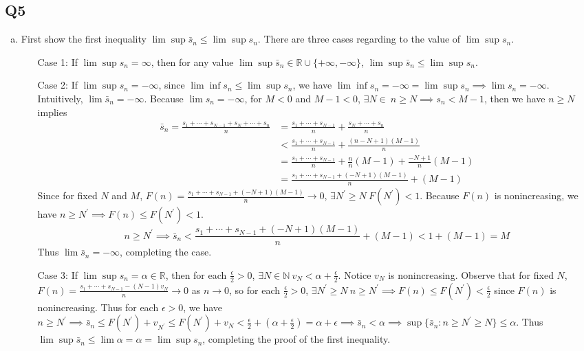 \documentclass[12pt,lettersize]{article}
\newcommand{\R}{\mathbb{R}}
\newcommand{\N}{\mathbb{N}}
\theoremstyle{remark}
\begin{document}
	\subsection*{Q5}
	\begin{enumerate}[(a)]
		\item First show the first inequality $\lim\sup\bar{s}_n\leq\lim\sup s_n$. There are three cases regarding to the value of $\lim\sup s_n$.
		\begin{itemize}
			\item[Case 1:] If $\lim\sup s_n=\infty$, then for any value $\lim\sup\bar{s}_n\in\R\cup\{+\infty,-\infty\}$, $\lim\sup\bar{s}_n\leq\lim\sup s_n$.
			
			\item[Case 2:] If $\lim\sup s_n=-\infty$, since $\lim\inf s_n\leq\lim\sup s_n$, we have $\lim\inf s_n=-\infty=\lim\sup s_n\implies \lim s_n=-\infty$. Intuitively, $\lim\bar{s}_n=-\infty$.  Because $\lim s_n=-\infty$, for $M<0$ and $M-1<0$, $\exists N\in\ n\geq N\implies s_n<M-1$, then we have $n\geq N$ implies
			\begin{align*}
				\bar{s}_n = \frac{s_1+\cdots+s_{N-1}+s_N+\cdots+s_n}{n} &= \frac{s_1+\cdots+s_{N-1}}{n}+\frac{s_N+\cdots+s_n}{n}\\
				&< \frac{s_1+\cdots+s_{N-1}}{n} + \frac{(n-N+1)(M-1)}{n}\\
				&= \frac{s_1+\cdots+s_{N-1}}{n} + \frac{n}{n}(M-1)+\frac{-N+1}{n}(M-1)\\
				&= \frac{s_1+\cdots+s_{N-1}+(-N+1)(M-1)}{n} + (M-1)
			\end{align*}
			Since for fixed $N$ and $M$, $F(n)=\frac{s_1+\cdots+s_{N-1}+(-N+1)(M-1)}{n}\rightarrow0$, $\exists N^\prime\geq N\ F(N^\prime)<1$. Because $F(n)$ is nonincreasing, we have $n\geq N^\prime\implies F(n)\leq F(N^\prime)<1$.
			\begin{displaymath}
				n\geq N^\prime\implies \bar{s}_n<\frac{s_1+\cdots+s_{N-1}+(-N+1)(M-1)}{n} + (M-1)<1+(M-1)=M
			\end{displaymath}
			Thus $\lim\bar{s}_n=-\infty$, completing the case.
			
			\item[Case 3:] If $\lim\sup s_n=\alpha\in\R$, then for each $\frac{\epsilon}{2}>0$, $\exists N\in\N\ v_N<\alpha+\frac{\epsilon}{2}$. Notice $v_N$ is nonincreasing. Observe that for fixed $N$, $F(n)=\frac{s_1+\cdots+s_{N-1}-(N-1)v_N}{n}\rightarrow 0$ as $n\rightarrow0$, so for each $\frac{\epsilon}{2}>0$, $\exists N^\prime\geq N\ n\geq N^\prime\implies F(n)\leq F(N^\prime)<\frac{\epsilon}{2}$ since $F(n)$ is nonincreasing. Thus for each $\epsilon>0$, we have $n\geq N^\prime\implies \bar{s}_n\leq F(N^\prime)+v_{N^\prime}\leq F(N^\prime)+v_N<\frac{\epsilon}{2}+(\alpha+\frac{\epsilon}{2})=\alpha+\epsilon\implies \bar{s}_n<\alpha\implies \sup\{\bar{s}_n: n\geq N^\prime\geq N\}\leq\alpha$. Thus $\lim\sup\bar{s}_n\leq\lim\alpha=\alpha=\lim\sup s_n$, completing the proof of the first inequality.
		\end{itemize}\smallskip
		

\end{enumerate}
\end{document}
